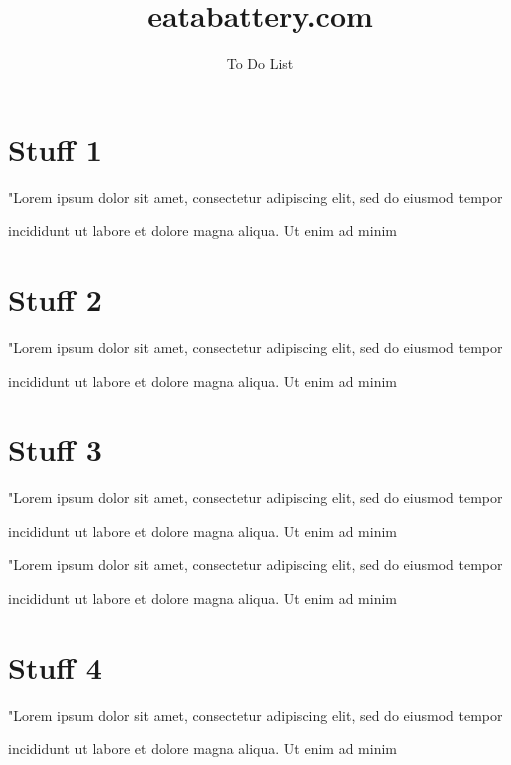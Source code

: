 \documentclass{checkList}
\title{eatabattery.com}
\author{To Do List}
\newcommand{\dummyJobs}{
	\item "Lorem ipsum dolor sit amet, consectetur
	\citem adipiscing elit, sed do eiusmod tempor
	\item incididunt ut labore et dolore magna aliqua. Ut enim ad minim
}
\begin{document}
\maketitle

\section{Stuff 1}
\begin{checklist}
\dummyJobs
\end{checklist}

\section{Stuff 2}
\begin{checklist}
\dummyJobs
\end{checklist}

\section{Stuff 3}
\begin{checklist}
\dummyJobs
\dummyJobs
\end{checklist}

\section{Stuff 4}
\begin{checklist}
\dummyJobs
\end{checklist}
\end{document}
